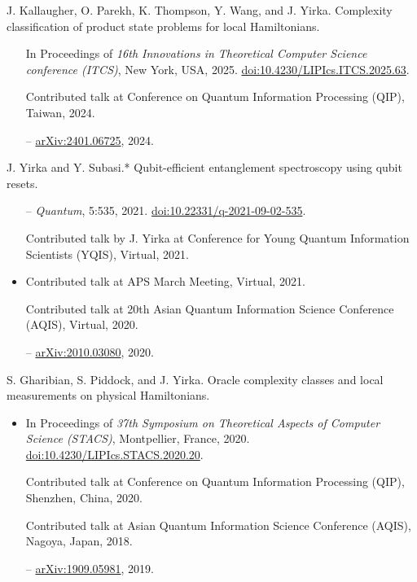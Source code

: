 \documentclass[11pt,letterpaper,serif]{moderncv}
\begin{document}
J. Kallaugher, O. Parekh, K. Thompson, Y. Wang, and J. Yirka.\quad
Complexity classification of product state problems for local Hamiltonians.
\begin{adjustwidth}{.25in}{}
	\begin{itemize}
		\item[\textbullet] In Proceedings of \textit{16th Innovations in Theoretical Computer Science conference (ITCS)}, New York, USA, 2025.\quad
		\href{https://doi.org/10.4230/LIPIcs.ITCS.2025.63}{doi:10.4230/LIPIcs.ITCS.2025.63}.
		\item[\textbullet] Contributed talk at Conference on Quantum Information Processing (QIP), Taiwan, 2024.
		\item[--] \href{https://arxiv.org/abs/2401.06725}{arXiv:2401.06725}, 2024.
	\end{itemize}
\end{adjustwidth}
\medskip

J. Yirka and Y. Subasi.*\quad
Qubit-efficient entanglement spectroscopy using qubit resets.
\begin{adjustwidth}{.25in}{}
	\begin{itemize}
		\item[--] \textit{Quantum}, 5:535, 2021.\quad
		\href{https://doi.org/10.22331/q-2021-09-02-535}{doi:10.22331/q-2021-09-02-535}.
		\item[\textbullet] Contributed talk by J. Yirka at Conference for Young Quantum Information Scientists (YQIS), Virtual, 2021.
		\item Contributed talk at APS March Meeting, Virtual, 2021.
		\item[\textbullet] Contributed talk at 20th Asian Quantum Information Science Conference (AQIS), Virtual, 2020.
		\item[--] \href{https://arxiv.org/abs/2010.03080}{arXiv:2010.03080}, 2020.
	\end{itemize}
\end{adjustwidth}
\medskip

S. Gharibian, S. Piddock, and J. Yirka.\quad
Oracle complexity classes and local measurements on physical Hamiltonians.
\begin{adjustwidth}{.25in}{}
	\begin{itemize}
		\item In Proceedings of \textit{37th Symposium on Theoretical Aspects of Computer Science (STACS)}, Montpellier, France, 2020.\quad
		\href{https://doi.org/10.4230/LIPIcs.STACS.2020.20}{doi:10.4230/LIPIcs.STACS.2020.20}.
		\item[\textbullet] Contributed talk at Conference on Quantum Information Processing (QIP), Shenzhen, China, 2020.
		\item[\textbullet] Contributed talk at Asian Quantum Information Science Conference (AQIS), Nagoya, Japan, 2018.
		\item[--]  \href{https://arxiv.org/abs/1909.05981}{arXiv:1909.05981}, 2019.
	\end{itemize}
\end{adjustwidth}
\medskip
\end{document}
